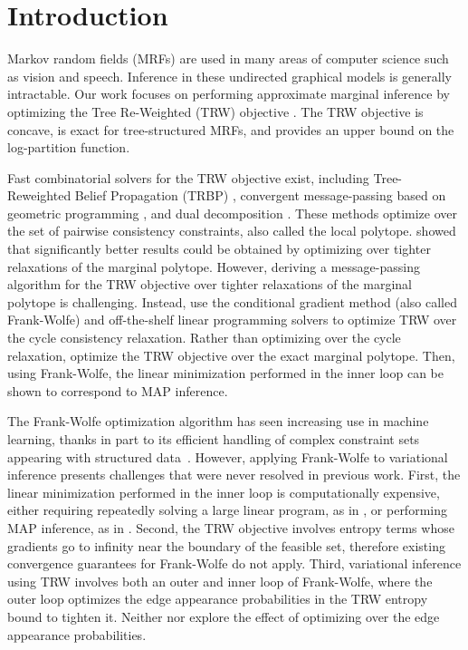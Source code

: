 \section{Introduction}
\vspace{-3mm}

Markov random fields (MRFs) are used in many areas of computer science such as vision and speech. 
Inference in these undirected graphical models is generally intractable. 
Our work focuses on performing approximate marginal inference 
%
by optimizing the Tree Re-Weighted (TRW)
objective \citep{wainwright2005new}. 
The TRW objective is concave, is exact for tree-structured MRFs, 
and provides an upper bound on the log-partition function. 

Fast combinatorial solvers for the TRW objective exist, including Tree-Reweighted 
Belief Propagation (TRBP) \citep{wainwright2005new}, convergent
message-passing based on geometric programming
\citep{globerson2012convergent}, and dual decomposition
\citep{Jancsary11}. These methods optimize over the set
of pairwise consistency constraints, also called the local polytope. \citet{sontag2007new} showed that significantly better 
results could be obtained by optimizing over tighter relaxations of the marginal 
polytope. However, deriving a message-passing algorithm for the TRW objective over tighter relaxations of the marginal polytope
is challenging. Instead, \citet{sontag2007new} use the
conditional gradient method (also called Frank-Wolfe) and
off-the-shelf linear programming solvers to optimize TRW over the cycle
consistency relaxation.
Rather than optimizing over the cycle relaxation,
\citet{belangerWorkshop2013} optimize the TRW objective over
the exact marginal polytope. Then,
using Frank-Wolfe, the linear minimization performed in
the inner loop can be shown to correspond to MAP inference. 

%
%
%
%

%
%
%
%
%
%
%
%
%

The Frank-Wolfe optimization algorithm has seen increasing use in machine learning,
thanks in part to its efficient handling of complex constraint sets appearing with structured data~\citep{jaggi2013revisiting,lacoste2015MFW}.
However, applying Frank-Wolfe to
variational inference presents challenges that were never
resolved in previous work. 
First, the linear minimization performed in the
inner loop is computationally expensive, either requiring repeatedly solving a
large linear program, as in \citet{sontag2007new}, or performing
MAP inference, as in \citet{belangerWorkshop2013}.
Second, the TRW objective involves entropy terms whose gradients go to
infinity near the boundary of the feasible set, therefore
existing convergence guarantees for Frank-Wolfe do not apply.
Third, variational inference using TRW involves
both an outer and inner loop of Frank-Wolfe, where the outer loop
optimizes the edge appearance probabilities in the TRW entropy bound to tighten it. 
Neither \citet{sontag2007new} nor \citet{belangerWorkshop2013} explore the effect of
optimizing over the edge appearance probabilities. %
%
%

